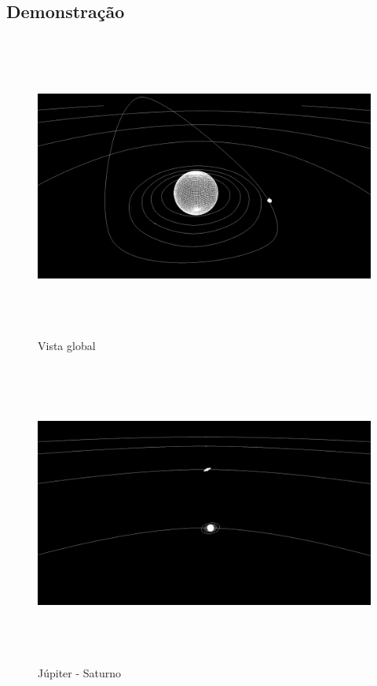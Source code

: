 \documentclass[11pt,a4paper]{report}
\begin{document}
\subsection{Demonstração}

\vspace{1cm}
\begin{figure}[H]
\centering
\includegraphics[width = 18cm,height = 10cm]{ss1.png}
\caption{Vista global}
\label{fig:demo1}
\end{figure}

\begin{figure}[H]
\centering
\includegraphics[width = 18cm,height = 10cm]{ss2.png}
\caption{Júpiter - Saturno}
\label{fig:demo2}
\end{figure}
\end{document}

